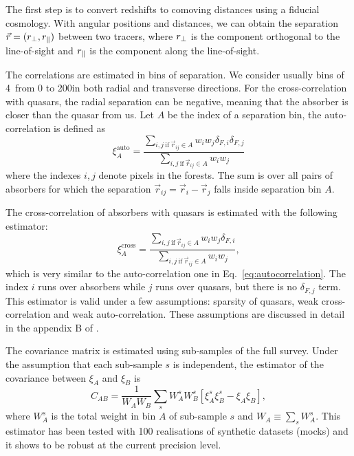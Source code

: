The first step is to convert redshifts to comoving distances using a fiducial cosmology. 
With angular positions and distances, we can obtain the separation $\vec{r} = ({r_\perp}, {r_\parallel})$
between two tracers, where ${r_\perp}$ is the component orthogonal to the line-of-sight and 
${r_\parallel}$ is the component along the line-of-sight. 

The correlations are estimated in bins of separation. We consider usually bins of 4\hmpc\ 
from 0 to 200\hmpc in both radial and transverse directions. For the cross-correlation 
with quasars, the radial separation can be negative, meaning that the absorber is closer 
than the quasar from us. Let $A$ be the index of a separation bin, the auto-correlation is 
defined as 
\begin{equation}
\xi^\mathrm{auto}_A = \frac{\sum_{i, j ~ \mathrm{if} ~ \vec{r}_{ij} \in A} w_i w_j \delta_{F, i} \delta_{F, j}}
                           {\sum_{i, j ~ \mathrm{if} ~ \vec{r}_{ij} \in A} w_i w_j}
\label{eq:autocorrelation} 
\end{equation}
where the indexes $i, j$ denote pixels in the forests. 
The sum is over all pairs of absorbers for which the separation 
$\vec{r}_{ij} = \vec{r}_i - \vec{r}_j$ falls inside separation bin $A$. 

The cross-correlation of absorbers with quasars is estimated with the following estimator: 
\begin{equation}
    \xi^\mathrm{cross}_A = \frac{\sum_{i, j ~ \mathrm{if} ~ \vec{r}_{ij} \in A} w_i w_j \delta_{F, i}}
                                {\sum_{i, j ~ \mathrm{if} ~ \vec{r}_{ij} \in A} w_i w_j},
    \label{eq:crosscorrelation} 
\end{equation}
which is very similar to the auto-correlation one in Eq.~\ref{eq:autocorrelation}.
The index $i$ runs over absorbers while $j$ runs over quasars, but there is no $\delta_{F,j}$ term. 
This estimator is valid under a few assumptions: sparsity of quasars, weak cross-correlation 
and weak auto-correlation. These assumptions are discussed in detail in the appendix B of
\cite{font-riberaLargescaleCrosscorrelationDamped2012}. 

The covariance matrix is estimated using sub-samples of the full survey. Under the 
assumption that each sub-sample $s$ is independent, the estimator of the covariance
between $\xi_A$ and $\xi_B$ is
\begin{equation}
C_{AB} = \frac{1}{W_A W_B} \sum_{s} W_A^s W_B^s [ \xi^s_A \xi^s_B - \xi_A \xi_B],
\label{eq:covariance-subsampling}
\end{equation}
where $W_A^s$ is the total weight in bin $A$ of sub-sample $s$ and $W_A \equiv \sum_s W_A^s$. 
This estimator has been tested with 100 realisations of synthetic datasets (mocks) and 
it shows to be robust at the current precision level. 

